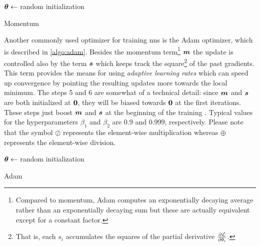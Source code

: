 \begin{algorithm}[H]
	\BlankLine
	$\boldsymbol{\theta} \gets$ random initialization\;
	\caption[Momentum]{Momentum \parencite{Polyak1964}}
	\label{algo:momentum}
\end{algorithm}

Another commonly used optimizer for training \glspl{nn} is the
Adam optimizer, which is described in \Algorithm{} \ref{algo:adam}.
Besides the momentum term\footnote{Compared to momentum, Adam
computes an exponentially decaying average rather than an exponentially decaying
sum but these are actually equivalent except for a constant factor.} $\boldsymbol{m}$
the update is controlled also by the term $\boldsymbol{s}$ which keeps track the
square\footnote{That is, each $s_i$ accumulates the squares of the partial
derivative $\frac{\partial \mathcal{L}}{\partial \theta_i}$.} of the past gradients. This term provides
the means for using \emph{adaptive learning rates}
which can speed up convergence by pointing the resulting
updates more towards the local minimum. The steps 5 and 6
are somewhat of a technical detail: since $\boldsymbol{m}$ and $\boldsymbol{s}$ are both
initialized at $\boldsymbol{0}$, they will be biased towards $\boldsymbol{0}$ at the first
iterations. These steps just boost $\boldsymbol{m}$ and $\boldsymbol{s}$ at the beginning
of the training \parencite{ml}. Typical values for the hyperparameters
$\beta_1$ and $\beta_2$ are 0.9 and 0.999, respectively. Please note that the
symbol $\oslash$ represents the element-wise multiplication whereas $\oplus$
represents the element-wise division.

\begin{algorithm}[H]
	\BlankLine
	$\boldsymbol{\theta} \gets$ random initialization\;
	\caption[Adam]{Adam \parencite{Kingma2017}}
	\label{algo:adam}
\end{algorithm}

